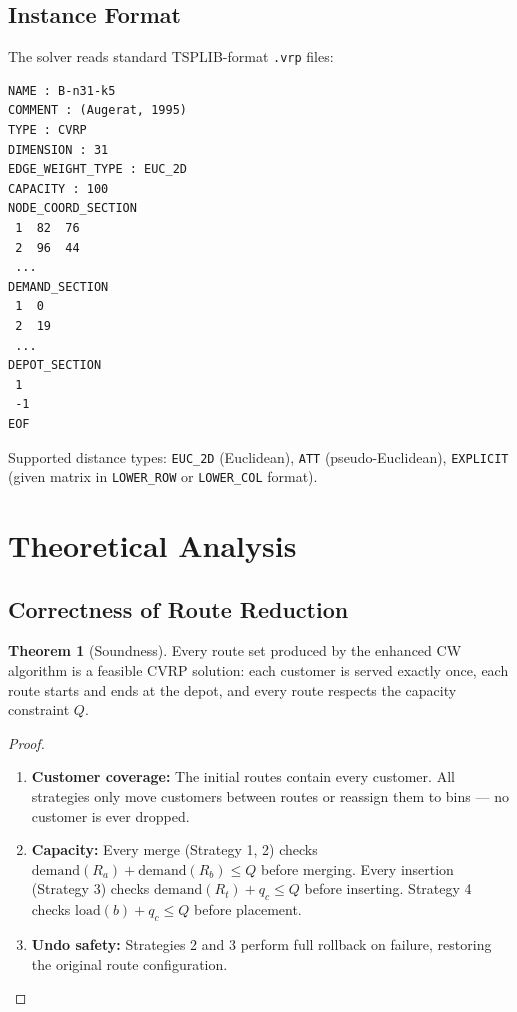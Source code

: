 \documentclass[12pt,a4paper]{article}
\theoremstyle{definition}
\newtheorem{theorem}{Theorem}[section]
\begin{document}
\subsection{Instance Format}

The solver reads standard TSPLIB-format \texttt{.vrp} files:

\begin{verbatim}
NAME : B-n31-k5
COMMENT : (Augerat, 1995)
TYPE : CVRP
DIMENSION : 31
EDGE_WEIGHT_TYPE : EUC_2D
CAPACITY : 100
NODE_COORD_SECTION
 1  82  76
 2  96  44
 ...
DEMAND_SECTION
 1  0
 2  19
 ...
DEPOT_SECTION
 1
 -1
EOF
\end{verbatim}

Supported distance types: \texttt{EUC\_2D} (Euclidean), \texttt{ATT} (pseudo-Euclidean), \texttt{EXPLICIT} (given matrix in \texttt{LOWER\_ROW} or \texttt{LOWER\_COL} format).

\section{Theoretical Analysis}

\subsection{Correctness of Route Reduction}

\begin{theorem}[Soundness]
Every route set produced by the enhanced CW algorithm is a feasible CVRP solution: each customer is served exactly once, each route starts and ends at the depot, and every route respects the capacity constraint $Q$.
\end{theorem}

\begin{proof}
\begin{enumerate}
    \item \textbf{Customer coverage:} The initial routes contain every customer. All strategies only move customers between routes or reassign them to bins --- no customer is ever dropped.
    \item \textbf{Capacity:} Every merge (Strategy 1, 2) checks $\text{demand}(R_a) + \text{demand}(R_b) \leq Q$ before merging. Every insertion (Strategy 3) checks $\text{demand}(R_t) + q_c \leq Q$ before inserting. Strategy 4 checks $\text{load}(b) + q_c \leq Q$ before placement.
    \item \textbf{Undo safety:} Strategies 2 and 3 perform full rollback on failure, restoring the original route configuration.
\end{enumerate}
\end{proof}
\end{document}
